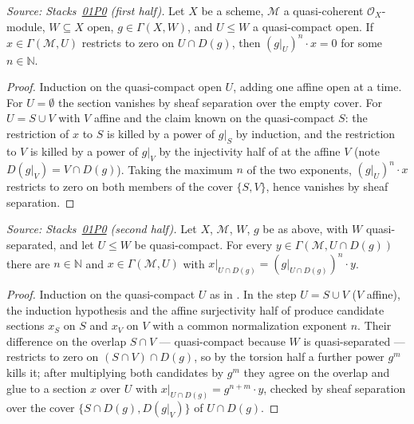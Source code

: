 \begin{lemma}
  \label{lem:qcqs_section_localization_torsion}
  \leanok
  \textit{Source: Stacks~\href{https://stacks.math.columbia.edu/tag/01P0}{01P0}
  (first half).}
  Let $X$ be a scheme, $\mathcal{M}$ a quasi-coherent $\mathcal{O}_X$-module,
  $W \subseteq X$ open, $g \in \Gamma(X, W)$, and $U \le W$ a quasi-compact
  open. If $x \in \Gamma(\mathcal{M}, U)$ restricts to zero on
  $U \cap D(g)$, then $(g|_U)^n \cdot x = 0$ for some $n \in \mathbb{N}$.
\end{lemma}
\begin{proof}
  \leanok
  Induction on the quasi-compact open $U$, adding one affine open at a time.
  For $U = \emptyset$ the section vanishes by sheaf separation over the empty
  cover. For $U = S \cup V$ with $V$ affine and the claim known on the
  quasi-compact $S$: the restriction of $x$ to $S$ is killed by a power of
  $g|_S$ by induction, and the restriction to $V$ is killed by a power of
  $g|_V$ by the injectivity half of
   at the affine $V$ (note
  $D(g|_V) = V \cap D(g)$). Taking the maximum $n$ of the two exponents,
  $(g|_U)^n \cdot x$ restricts to zero on both members of the cover
  $\{S, V\}$, hence vanishes by sheaf separation.
\end{proof}

\begin{lemma}
  \label{lem:qcqs_section_localization_surj}
  \leanok
  \textit{Source: Stacks~\href{https://stacks.math.columbia.edu/tag/01P0}{01P0}
  (second half).}
  Let $X$, $\mathcal{M}$, $W$, $g$ be as above, with $W$ quasi-separated, and
  let $U \le W$ be quasi-compact. For every
  $y \in \Gamma(\mathcal{M}, U \cap D(g))$ there are $n \in \mathbb{N}$ and
  $x \in \Gamma(\mathcal{M}, U)$ with
  $x|_{U \cap D(g)} = (g|_{U \cap D(g)})^n \cdot y$.
\end{lemma}
\begin{proof}
  \leanok
  Induction on the quasi-compact $U$ as in
  . In the step $U = S \cup V$
  ($V$ affine), the induction hypothesis and the affine surjectivity half of
   produce candidate sections
  $x_S$ on $S$ and $x_V$ on $V$ with a common normalization exponent $n$.
  Their difference on the overlap $S \cap V$ --- quasi-compact because $W$ is
  quasi-separated --- restricts to zero on $(S \cap V) \cap D(g)$, so by the
  torsion half a further power $g^m$ kills it; after multiplying both
  candidates by $g^m$ they agree on the overlap and glue to a section $x$
  over $U$ with $x|_{U \cap D(g)} = g^{n+m} \cdot y$, checked by sheaf
  separation over the cover $\{S \cap D(g), D(g|_V)\}$ of $U \cap D(g)$.
\end{proof}

